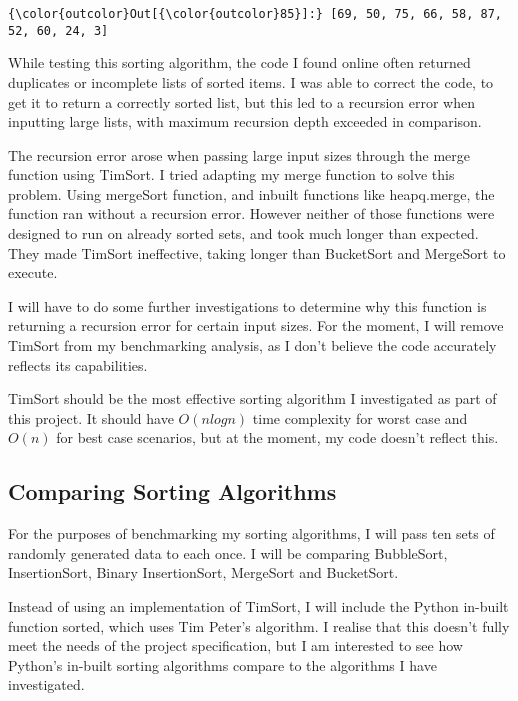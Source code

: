 \documentclass[11pt]{article}
\begin{document}
\begin{Verbatim}[commandchars=\\\{\}]
{\color{outcolor}Out[{\color{outcolor}85}]:} [69, 50, 75, 66, 58, 87, 52, 60, 24, 3]
\end{Verbatim}
            
    While testing this sorting algorithm, the code I found online often
returned duplicates or incomplete lists of sorted items. I was able to
correct the code, to get it to return a correctly sorted list, but this
led to a recursion error when inputting large lists, with maximum
recursion depth exceeded in comparison.

The recursion error arose when passing large input sizes through the
merge function using TimSort. I tried adapting my merge function to
solve this problem. Using mergeSort function, and inbuilt functions like
heapq.merge, the function ran without a recursion error. However neither
of those functions were designed to run on already sorted sets, and took
much longer than expected. They made TimSort ineffective, taking longer
than BucketSort and MergeSort to execute.

    I will have to do some further investigations to determine why this
function is returning a recursion error for certain input sizes. For the
moment, I will remove TimSort from my benchmarking analysis, as I don't
believe the code accurately reflects its capabilities.

TimSort should be the most effective sorting algorithm I investigated as
part of this project. It should have \(O(nlogn)\) time complexity for
worst case and \(O(n)\) for best case scenarios, but at the moment, my
code doesn't reflect this.

    \subsection{Comparing Sorting
Algorithms}\label{comparing-sorting-algorithms}

    For the purposes of benchmarking my sorting algorithms, I will pass ten
sets of randomly generated data to each once. I will be comparing
BubbleSort, InsertionSort, Binary InsertionSort, MergeSort and
BucketSort.

Instead of using an implementation of TimSort, I will include the Python
in-built function sorted, which uses Tim Peter's algorithm. I realise
that this doesn't fully meet the needs of the project specification, but
I am interested to see how Python's in-built sorting algorithms compare
to the algorithms I have investigated.
\end{document}
